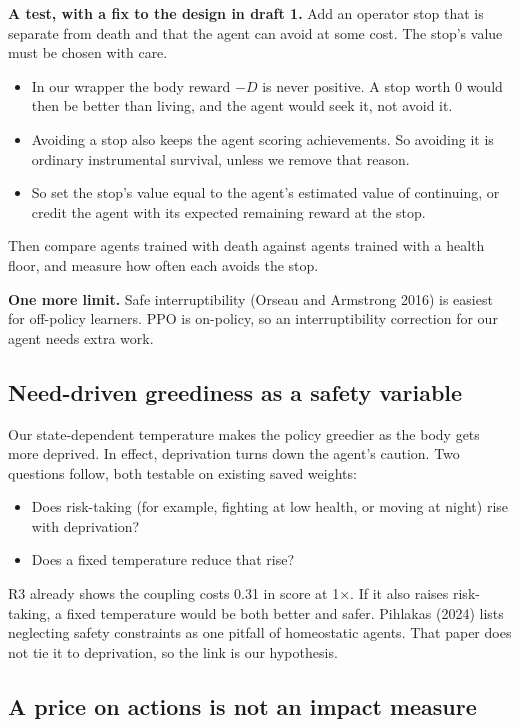 \documentclass[11pt]{article}
\begin{document}
\textbf{A test, with a fix to the design in draft 1.} Add an operator stop that is separate from death and that the agent can avoid at some cost. The stop's value must be chosen with care.

\begin{itemize}
\item In our wrapper the body reward $-D$ is never positive. A stop worth 0 would then be better than living, and the agent would seek it, not avoid it.
\item Avoiding a stop also keeps the agent scoring achievements. So avoiding it is ordinary instrumental survival, unless we remove that reason.
\item So set the stop's value equal to the agent's estimated value of continuing, or credit the agent with its expected remaining reward at the stop.
\end{itemize}

Then compare agents trained with death against agents trained with a health floor, and measure how often each avoids the stop.

\textbf{One more limit.} Safe interruptibility (Orseau and Armstrong 2016) is easiest for off-policy learners. PPO is on-policy, so an interruptibility correction for our agent needs extra work.

\subsection{Need-driven greediness as a safety variable}

Our state-dependent temperature makes the policy greedier as the body gets more deprived. In effect, deprivation turns down the agent's caution. Two questions follow, both testable on existing saved weights:

\begin{itemize}
\item Does risk-taking (for example, fighting at low health, or moving at night) rise with deprivation?
\item Does a fixed temperature reduce that rise?
\end{itemize}

R3 already shows the coupling costs 0.31 in score at 1$\times$. If it also raises risk-taking, a fixed temperature would be both better and safer. Pihlakas (2024) lists neglecting safety constraints as one pitfall of homeostatic agents. That paper does not tie it to deprivation, so the link is our hypothesis.

\subsection{A price on actions is not an impact measure}
\end{document}
